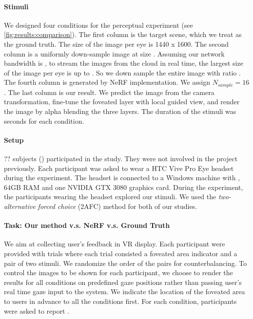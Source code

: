 \paragraph{Stimuli}
We designed four conditions for the perceptual experiment (see \autoref{fig:results:comparison}). The first column is the target scene, which we treat as the ground truth. The size of the image per eye is 1440 x 1600. The second column is a uniformly down-sample image at size . Assuming our network bandwidth is , to stream the images from the cloud in real time, the largest size of the image per eye is up to . So we down sample the entire image with ratio .
The fourth column is generated by NeRF implementation. We assign $N_{sample}=16$. The last column is our result. We predict the image from the camera transformation, fine-tune the foveated layer with local guided view, and render the image by alpha blending the three layers. The duration of the stimuli was  seconds for each condition. 

\paragraph{Setup}
?? subjects () participated in the study. They were not involved in the project previously. Each participant was asked to wear a HTC Vive Pro Eye headset during the experiment. The headset is connected to a Windows machine with , 64GB RAM and one NVIDIA GTX 3080 graphics card. During the experiment, the participants wearing the headset explored our stimuli. We used the \textit{two-alternative forced choice} (2AFC) method for both of our studies. 

\paragraph{Task: Our method v.s. NeRF v.s. Ground Truth}
We aim at collecting user's feedback in VR display. Each participant were provided with  trials where each trial consisted a foveated area indicator and a pair of two stimuli. We randomize the order of the pairs for counterbalancing. To control the images to be shown for each participant, we choose to render the results for all conditions on predefined gaze positions rather than passing user's real time gaze input to the system. We indicate the location of the foveated area to users in advance to all the conditions first. For each condition, participants were asked to report . 

